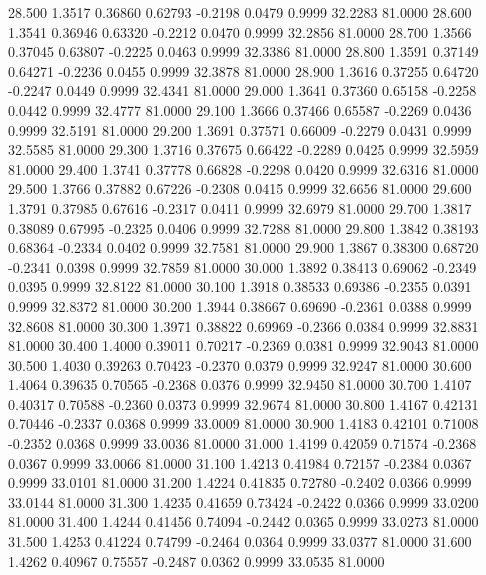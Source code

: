   28.500   1.3517   0.36860   0.62793  -0.2198   0.0479   0.9999  32.2283  81.0000
  28.600   1.3541   0.36946   0.63320  -0.2212   0.0470   0.9999  32.2856  81.0000
  28.700   1.3566   0.37045   0.63807  -0.2225   0.0463   0.9999  32.3386  81.0000
  28.800   1.3591   0.37149   0.64271  -0.2236   0.0455   0.9999  32.3878  81.0000
  28.900   1.3616   0.37255   0.64720  -0.2247   0.0449   0.9999  32.4341  81.0000
  29.000   1.3641   0.37360   0.65158  -0.2258   0.0442   0.9999  32.4777  81.0000
  29.100   1.3666   0.37466   0.65587  -0.2269   0.0436   0.9999  32.5191  81.0000
  29.200   1.3691   0.37571   0.66009  -0.2279   0.0431   0.9999  32.5585  81.0000
  29.300   1.3716   0.37675   0.66422  -0.2289   0.0425   0.9999  32.5959  81.0000
  29.400   1.3741   0.37778   0.66828  -0.2298   0.0420   0.9999  32.6316  81.0000
  29.500   1.3766   0.37882   0.67226  -0.2308   0.0415   0.9999  32.6656  81.0000
  29.600   1.3791   0.37985   0.67616  -0.2317   0.0411   0.9999  32.6979  81.0000
  29.700   1.3817   0.38089   0.67995  -0.2325   0.0406   0.9999  32.7288  81.0000
  29.800   1.3842   0.38193   0.68364  -0.2334   0.0402   0.9999  32.7581  81.0000
  29.900   1.3867   0.38300   0.68720  -0.2341   0.0398   0.9999  32.7859  81.0000
  30.000   1.3892   0.38413   0.69062  -0.2349   0.0395   0.9999  32.8122  81.0000
  30.100   1.3918   0.38533   0.69386  -0.2355   0.0391   0.9999  32.8372  81.0000
  30.200   1.3944   0.38667   0.69690  -0.2361   0.0388   0.9999  32.8608  81.0000
  30.300   1.3971   0.38822   0.69969  -0.2366   0.0384   0.9999  32.8831  81.0000
  30.400   1.4000   0.39011   0.70217  -0.2369   0.0381   0.9999  32.9043  81.0000
  30.500   1.4030   0.39263   0.70423  -0.2370   0.0379   0.9999  32.9247  81.0000
  30.600   1.4064   0.39635   0.70565  -0.2368   0.0376   0.9999  32.9450  81.0000
  30.700   1.4107   0.40317   0.70588  -0.2360   0.0373   0.9999  32.9674  81.0000
  30.800   1.4167   0.42131   0.70446  -0.2337   0.0368   0.9999  33.0009  81.0000
  30.900   1.4183   0.42101   0.71008  -0.2352   0.0368   0.9999  33.0036  81.0000
  31.000   1.4199   0.42059   0.71574  -0.2368   0.0367   0.9999  33.0066  81.0000
  31.100   1.4213   0.41984   0.72157  -0.2384   0.0367   0.9999  33.0101  81.0000
  31.200   1.4224   0.41835   0.72780  -0.2402   0.0366   0.9999  33.0144  81.0000
  31.300   1.4235   0.41659   0.73424  -0.2422   0.0366   0.9999  33.0200  81.0000
  31.400   1.4244   0.41456   0.74094  -0.2442   0.0365   0.9999  33.0273  81.0000
  31.500   1.4253   0.41224   0.74799  -0.2464   0.0364   0.9999  33.0377  81.0000
  31.600   1.4262   0.40967   0.75557  -0.2487   0.0362   0.9999  33.0535  81.0000
